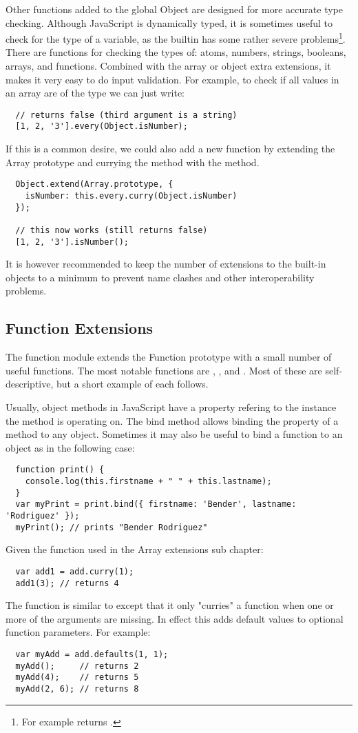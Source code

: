Other functions added to the global Object are designed for more accurate type checking. Although JavaScript is dynamically typed, it is sometimes useful to check for the type of a variable, as the builtin  has some rather severe problems\footnote{For example  returns .}. There are functions for checking the types of: atoms, numbers, strings, booleans, arrays, and functions. Combined with the array or object extra extensions, it makes it very easy to do input validation. For example, to check if all values in an array are of the type  we can just write:
\begin{verbatim}
  // returns false (third argument is a string)
  [1, 2, '3'].every(Object.isNumber);
\end{verbatim}
If this is a common desire, we could also add a new function by extending the Array prototype and currying the  method with the  method.
\begin{verbatim}
  Object.extend(Array.prototype, {
    isNumber: this.every.curry(Object.isNumber)
  });

  // this now works (still returns false)
  [1, 2, '3'].isNumber();
\end{verbatim}
It is however recommended to keep the number of extensions to the built-in objects to a minimum to prevent name clashes and other interoperability problems.

\subsection{Function Extensions}
The function module extends the Function prototype with a small number of useful functions. The most notable functions are , , and . Most of these are self-descriptive, but a short example of each follows.

Usually, object methods in JavaScript have a  property refering to the instance the method is operating on. The bind method allows binding the  property of a method to any object. Sometimes it may also be useful to bind a function to an object as in the following case:
\begin{verbatim}
  function print() {
    console.log(this.firstname + " " + this.lastname);
  }
  var myPrint = print.bind({ firstname: 'Bender', lastname: 'Rodriguez' });
  myPrint(); // prints "Bender Rodriguez"
\end{verbatim}
Given the  function used in the Array extensions sub chapter:
\begin{verbatim}
  var add1 = add.curry(1);
  add1(3); // returns 4
\end{verbatim}
The  function is similar to  except that it only "curries" a function when one or more of the arguments are missing. In effect this adds default values to optional function parameters. For example:
\begin{verbatim}
  var myAdd = add.defaults(1, 1);
  myAdd();     // returns 2
  myAdd(4);    // returns 5
  myAdd(2, 6); // returns 8
\end{verbatim}
